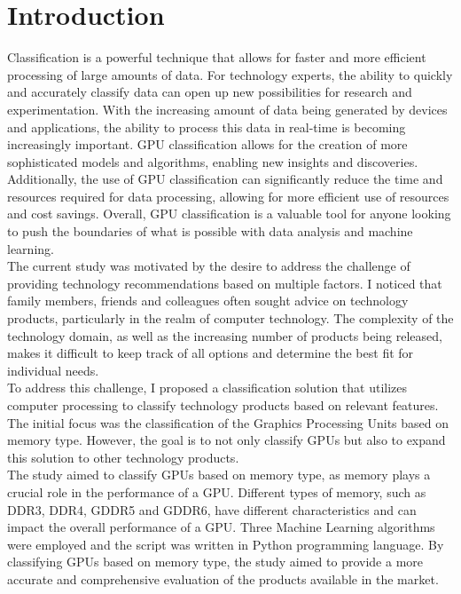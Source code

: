 \documentclass[conference,onecolumn]{IEEEtran}
\begin{document}
\section{Introduction}
\cite{C0}Classification is a powerful technique that allows for faster and more efficient processing of large amounts of data. For technology experts, the ability to quickly and accurately classify data can open up new possibilities for research and experimentation. With the increasing amount of data being generated by devices and applications, the ability to process this data in real-time is becoming increasingly important. GPU classification allows for the creation of more sophisticated models and algorithms, enabling new insights and discoveries. Additionally, the use of GPU classification can significantly reduce the time and resources required for data processing, allowing for more efficient use of resources and cost savings. Overall, GPU classification is a valuable tool for anyone looking to push the boundaries of what is possible with data analysis and machine learning.\\

The current study was motivated by the desire to address the challenge of providing technology recommendations based on multiple factors. I noticed that family members, friends and colleagues often sought advice on technology products, particularly in the realm of computer technology. The complexity of the technology domain, as well as the increasing number of products being released, makes it difficult to keep track of all options and determine the best fit for individual needs.\\

To address this challenge, I proposed a classification solution that utilizes computer processing to classify technology products based on relevant features. The initial focus was the classification of the Graphics Processing Units based on memory type. However, the goal is to not only classify GPUs but also to expand this solution to other technology products.\\

The study aimed to classify GPUs based on memory type, as memory plays a crucial role in the performance of a GPU. Different types of memory, such as DDR3, DDR4, GDDR5 and GDDR6, have different characteristics and can impact the overall performance of a GPU. Three Machine Learning algorithms were employed and the script was written in Python programming language. By classifying GPUs based on memory type, the study aimed to provide a more accurate and comprehensive evaluation of the products available in the market.
\end{document}
